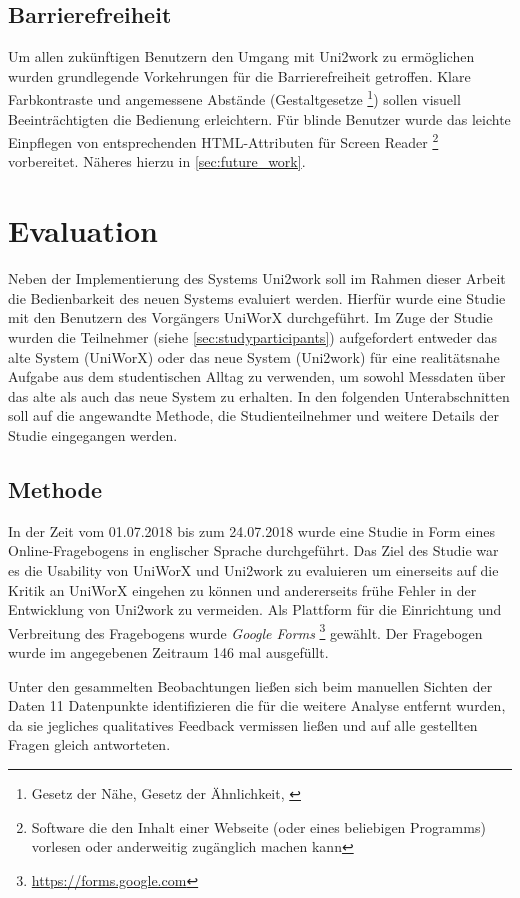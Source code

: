 \documentclass[11pt,a4paper,twoside,ngerman]{article}
\begin{document}
\subsection{Barrierefreiheit}
Um allen zukünftigen Benutzern den Umgang mit Uni2work zu ermöglichen wurden grundlegende Vorkehrungen für die Barrierefreiheit getroffen. Klare Farbkontraste und angemessene Abstände (Gestaltgesetze \footnote{Gesetz der Nähe, Gesetz der Ähnlichkeit, \cite{web:wikigestalt}}) sollen visuell Beeinträchtigten die Bedienung erleichtern. Für blinde Benutzer wurde das leichte Einpflegen von entsprechenden HTML-Attributen für Screen Reader \footnote{Software die den Inhalt einer Webseite (oder eines beliebigen Programms) vorlesen oder anderweitig zugänglich machen kann} vorbereitet. Näheres hierzu in \autoref{sec:future_work}.

\clearpage
\section{Evaluation} \label{sec:userstudies}
Neben der Implementierung des Systems Uni2work soll im Rahmen dieser Arbeit die Bedienbarkeit des neuen Systems evaluiert werden. Hierfür wurde eine Studie mit den Benutzern des Vorgängers UniWorX durchgeführt. Im Zuge der Studie wurden die Teilnehmer (siehe \autoref{sec:studyparticipants}) aufgefordert entweder das alte System (UniWorX) oder das neue System (Uni2work) für eine realitätsnahe Aufgabe aus dem studentischen Alltag zu verwenden, um sowohl Messdaten über das alte als auch das neue System zu erhalten. In den folgenden Unterabschnitten soll auf die angewandte Methode, die Studienteilnehmer und weitere Details der Studie eingegangen werden.

\subsection{Methode} \label{sec:method}
In der Zeit vom 01.07.2018 bis zum 24.07.2018 wurde eine Studie in Form eines Online-Fragebogens in englischer Sprache durchgeführt.
Das Ziel des Studie war es die Usability von UniWorX und Uni2work zu evaluieren um einerseits auf die Kritik an UniWorX eingehen zu können und andererseits frühe Fehler in der Entwicklung von Uni2work zu vermeiden. Als Plattform für die Einrichtung und Verbreitung des Fragebogens wurde \textit{Google Forms} \footnote{\url{https://forms.google.com}} gewählt. Der Fragebogen wurde im angegebenen Zeitraum 146 mal ausgefüllt.

Unter den gesammelten Beobachtungen ließen sich beim manuellen Sichten der Daten 11 Datenpunkte identifizieren die für die weitere Analyse entfernt wurden, da sie jegliches qualitatives Feedback vermissen ließen und auf alle gestellten Fragen gleich antworteten.
\end{document}
